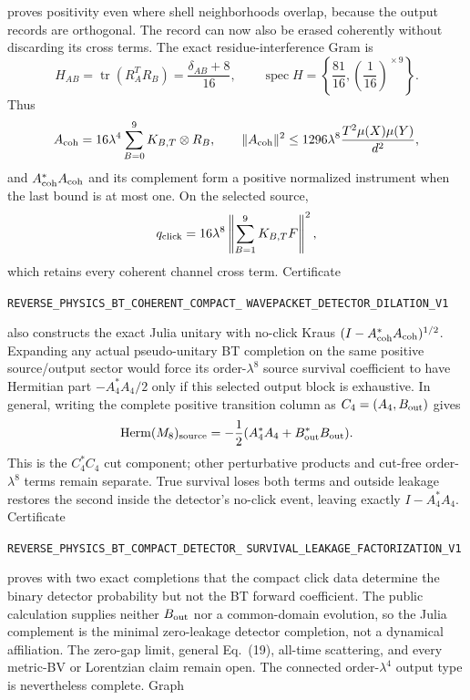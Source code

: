 \documentclass[11pt]{article}
\theoremstyle{definition}
\theoremstyle{remark}
\begin{document}
\par\noindent
proves positivity even where shell neighborhoods overlap, because the output
records are orthogonal.  The record can now also be erased coherently without
discarding its cross terms.  The exact residue-interference Gram is
\[
 H_{AB}=\operatorname{tr}(R_A^TR_B)=\frac{\delta_{AB}+8}{16},
 \qquad
 \operatorname{spec}H=\left\{\frac{81}{16},
 \left(\frac1{16}\right)^{\!\times9}\right\}.
\]
Thus
\[
 A_{\rm coh}=16\lambda^4\sum_{B=0}^{9}K_{B,T}\otimes R_B,
 \qquad
 \|A_{\rm coh}\|^2\leq
 1296\lambda^8\frac{T^2\mu(X)\mu(Y)}{d^2},
\]
and $A_{\rm coh}^*A_{\rm coh}$ and its complement form a positive normalized
instrument when the last bound is at most one.  On the selected source,
\[
 q_{\rm click}=16\lambda^8
 \left\|\sum_{B=1}^{9}K_{B,T}F\right\|^2,
\]
which retains every coherent channel cross term.  Certificate
\par\noindent
\texttt{REVERSE\_PHYSICS\_BT\_COHERENT\_COMPACT\_}
\allowbreak\texttt{WAVEPACKET\_DETECTOR\_DILATION\_V1}
\par\noindent
also constructs the exact Julia unitary with no-click Kraus
$(I-A_{\rm coh}^*A_{\rm coh})^{1/2}$.  Expanding any actual pseudo-unitary BT
completion on the same positive source/output sector would force its
order-$\lambda^8$ source survival coefficient to have Hermitian part
$-A_4^*A_4/2$ only if this selected output block is exhaustive.  In general,
writing the complete positive transition column as
$C_4=(A_4,B_{\rm out})$ gives
\[
 \operatorname{Herm}(M_8)_{\rm source}
 =-\frac12(A_4^*A_4+B_{\rm out}^*B_{\rm out}).
\]
This is the $C_4^*C_4$ cut component; other perturbative products and cut-free
order-$\lambda^8$ terms remain separate.
True survival loses both terms and outside leakage restores the second inside
the detector's no-click event, leaving exactly $I-A_4^*A_4$.  Certificate
\par\noindent
\texttt{REVERSE\_PHYSICS\_BT\_COMPACT\_DETECTOR\_}
\allowbreak\texttt{SURVIVAL\_LEAKAGE\_FACTORIZATION\_V1}
\par\noindent
proves with two exact completions that the compact click data determine the
binary detector probability but not the BT forward coefficient.  The public
calculation supplies neither $B_{\rm out}$ nor a common-domain evolution, so
the Julia complement is the minimal zero-leakage detector completion, not a
dynamical affiliation.  The zero-gap limit,
general Eq.~(19), all-time scattering, and every metric-BV or Lorentzian claim
remain open.
The connected order-$\lambda^4$ output type is nevertheless complete.  Graph
\end{document}
